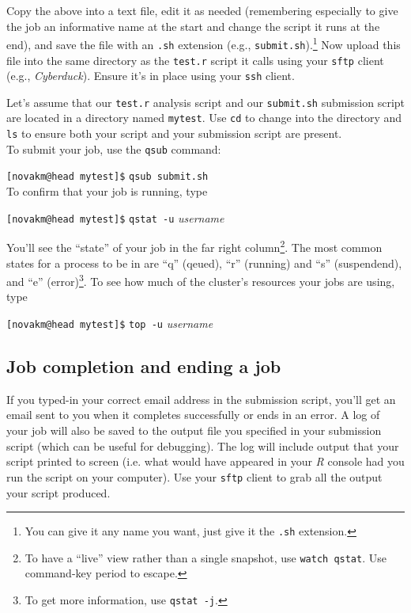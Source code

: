 \documentclass[12pt,letterpaper]{article}
\begin{document}
Copy the above into a text file, edit it as needed (remembering especially to give the job an informative name at the start and change the script it runs at the end), and save the file with an \texttt{.sh} extension (e.g., \texttt{submit.sh}).\footnote{You can give it any name you want, just give it the \texttt{.sh} extension.}
Now upload this file into the same directory as the \texttt{test.r} script it calls using your \texttt{sftp} client (e.g., \emph{Cyberduck}).
Ensure it's in place using your \texttt{ssh} client.

Let's assume that our \texttt{test.r} analysis script and our \texttt{submit.sh} submission script are located in a directory named \texttt{mytest}.
Use \texttt{cd} to change into the directory and \texttt{ls} to ensure both your script and your submission script are present.\\

\noindent
To submit your job, use the \texttt{qsub} command:

\texttt{[novakm@head mytest]\$} \texttt{qsub submit.sh}
\\

\noindent
To confirm that your job is running, type

\texttt{[novakm@head mytest]\$} \texttt{qstat -u} \emph{username}

\noindent
You'll see the ``state'' of your job in the far right column\footnote{To have a ``live'' view rather than a single snapshot, use \texttt{watch qstat}.  Use command-key period to escape.}.
The most common states for a process to be in are ``q'' (qeued), ``r'' (running) and ``s'' (suspendend), and ``e'' (error)\footnote{To get more information, use \texttt{qstat -j}.}.
To see how much of the cluster's resources your jobs are using, type

\texttt{[novakm@head mytest]\$} \texttt{top -u} \emph{username}

\subsection{Job completion and ending a job}
If you typed-in your correct email address in the submission script, you'll get an email sent to you when it completes successfully or ends in an error.
A log of your job will also be saved to the output file you specified in your submission script (which can be useful for debugging).
The log will include output that your script printed to screen (i.e. what would have appeared in your \emph{R} console had you run the script on your computer).
Use your \texttt{sftp} client to grab all the output your script produced.
\end{document}

